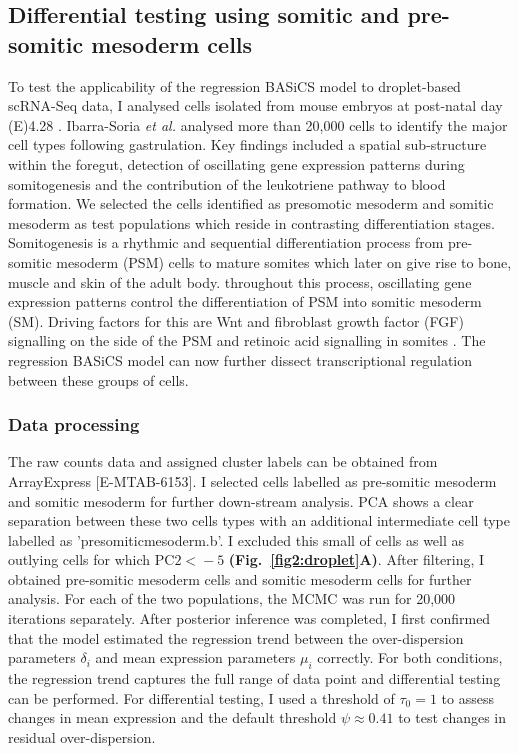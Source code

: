 \newpage

\subsection{Differential testing using somitic and pre-somitic mesoderm cells}

To test the applicability of the regression BASiCS model to droplet-based scRNA-Seq data, I analysed cells isolated from mouse embryos at post-natal day (E)4.28 \citep{Ibarra-Soria2018}. Ibarra-Soria \emph{et al.} analysed more than 20,000 cells to identify the major cell types following gastrulation. Key findings included a spatial sub-structure within the foregut, detection of oscillating gene expression patterns during somitogenesis and the contribution of the leukotriene pathway to blood formation.  We selected the cells identified as presomotic mesoderm and somitic mesoderm as test populations which reside in contrasting differentiation stages. Somitogenesis is a rhythmic and sequential differentiation process from pre-somitic mesoderm (PSM) cells to mature somites which later on give rise to bone, muscle and skin of the adult body. throughout this process, oscillating gene expression patterns control the differentiation of PSM into somitic mesoderm (SM). Driving factors for this are Wnt and fibroblast growth factor (FGF) signalling on the side of the PSM and retinoic acid signalling in somites \cite{Oates2012}. The regression BASiCS model can now further dissect transcriptional regulation between these groups of cells.

\subsubsection{Data processing}

The raw counts data and assigned cluster labels can be obtained from ArrayExpress [E-MTAB-6153]. I selected cells labelled as pre-somitic mesoderm and somitic mesoderm for further down-stream analysis. PCA shows a clear separation between these two cells types with an additional intermediate cell type labelled as 'presomiticmesoderm.b'. I excluded this small of cells as well as outlying cells for which $\text{PC2}{}<{}-5$ \textbf{(Fig.~\ref{fig2:droplet}A)}. After filtering, I obtained  pre-somitic mesoderm cells and  somitic mesoderm cells for further analysis. For each of the two populations, the MCMC was run for 20,000 iterations separately. After posterior inference was completed, I first confirmed that the model estimated the regression trend between the over-dispersion parameters $\delta_i$ and mean expression parameters $\mu_i$ correctly. For both conditions, the regression trend captures the full range of data point and differential testing can be performed. For differential testing, I used a threshold of $\tau_0=1$ to assess changes in mean expression and the default threshold $\psi\approx{}0.41$ to test changes in residual over-dispersion.  

